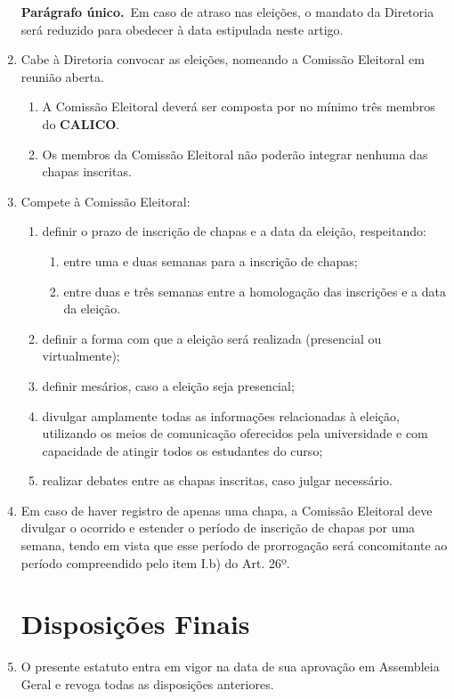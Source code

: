 \documentclass[12pt,a4paper]{article}
\newcommand{\calico}{\textbf{CALICO}}
\newcommand{\parun}{\textbf{Parágrafo único.}\ }
\begin{document}
\begin{enumerate}[label=\textbf{Art. \arabic*º.}]
    \parun Em caso de atraso nas eleições, o mandato da Diretoria será reduzido para obedecer à data estipulada neste artigo.

    \item Cabe à Diretoria convocar as eleições, nomeando a Comissão Eleitoral em reunião aberta.

    \begin{enumerate}[label=\textbf{\S\arabic*º.}]
        \item{A Comissão Eleitoral deverá ser composta por no mínimo três membros do \calico.}
        \item{Os membros da Comissão Eleitoral não poderão integrar nenhuma das chapas inscritas.}
     \end{enumerate}

    \item Compete à Comissão Eleitoral:
    \begin{enumerate}[label=\textbf{\Roman* - }]
        \item definir o prazo de inscrição de chapas e a data da eleição, respeitando:
            \begin{enumerate}[label=\textbf{\alph*)}]
                \item entre uma e duas semanas para a inscrição de chapas;
                \item entre duas e três semanas entre a homologação das inscrições e a data da eleição.
            \end{enumerate}

        \item definir a forma com que a eleição será realizada (presencial ou virtualmente);
        \item definir mesários, caso a eleição seja presencial;
        \item divulgar amplamente todas as informações relacionadas à eleição, utilizando os meios de comunicação oferecidos pela universidade e com capacidade de atingir todos os estudantes do curso;
        \item realizar debates entre as chapas inscritas, caso julgar necessário.
    \end{enumerate}

    \item Em caso de haver registro de apenas uma chapa, a Comissão Eleitoral deve divulgar o ocorrido e estender o período de inscrição de chapas por uma semana, tendo em vista que esse período de prorrogação será concomitante ao período compreendido pelo item I.b) do Art. 26º.

    
\section{Disposições Finais}

    \item O presente estatuto entra em vigor na data de sua aprovação em Assembleia Geral e revoga todas as disposições anteriores.

\end{enumerate}
\end{document}
